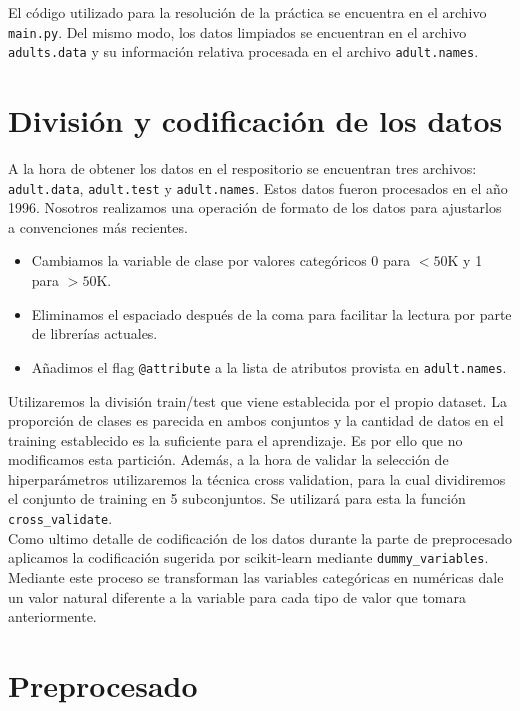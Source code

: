 \documentclass[11pt,a4paper]{article}
\begin{document}
El código utilizado para la resolución de la práctica se encuentra en el archivo \texttt{main.py}.  Del mismo modo, los datos limpiados se encuentran en el archivo \texttt{adults.data} y su información relativa procesada en el archivo \texttt{adult.names}.


\section{ División y codificación de los datos}

A la hora de obtener los datos en el respositorio se encuentran tres archivos: \texttt{adult.data},  \texttt{adult.test} y \texttt{adult.names}. Estos datos fueron procesados en el año 1996. Nosotros realizamos una operación de formato de los datos para ajustarlos a convenciones más recientes.

\begin{itemize}
\item Cambiamos la variable de clase por valores categóricos 0 para $<50$K y 1 para $>50$K.
\item Eliminamos el espaciado después de la coma para facilitar la lectura por parte de librerías actuales.
\item Añadimos el flag \texttt{@attribute} a la lista de atributos provista en \texttt{adult.names}.
\end{itemize}

Utilizaremos la división train/test que viene establecida por el propio dataset. La proporción de clases es parecida en ambos conjuntos y la cantidad de datos en el training establecido es la suficiente para el aprendizaje. Es por ello que no modificamos esta partición. Además, a la hora de validar la selección de hiperparámetros utilizaremos la técnica cross validation, para la cual dividiremos el conjunto de training en 5 subconjuntos. Se utilizará para esta la función \texttt{cross\_validate}\cite{cv}.\\

Como ultimo detalle de codificación de los datos durante la parte de preprocesado aplicamos la codificación sugerida por scikit-learn mediante \texttt{dummy\_variables}. Mediante este proceso se transforman las variables categóricas en numéricas dale un valor natural diferente a la variable para cada tipo de valor que tomara anteriormente.

\section{Preprocesado}
\end{document}
